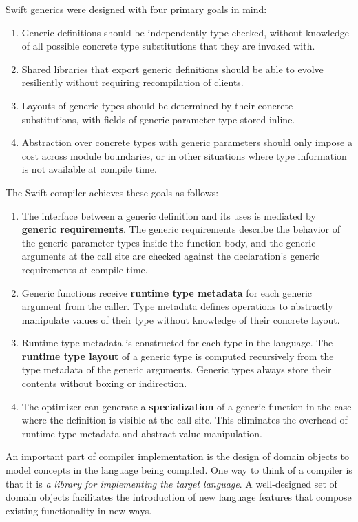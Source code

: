 \documentclass[a4paper,headsepline,bibliography=totoc,toc=flat,fleqn,twoside=semi]{scrbook}
\theoremstyle{definition}
\theoremstyle{definition}
\theoremstyle{definition}
\begin{document}
Swift generics were designed with four primary goals in mind:
\begin{enumerate}
\item Generic definitions should be independently type checked, without knowledge of all possible concrete type substitutions that they are invoked with.
\item Shared libraries that export generic definitions should be able to evolve resiliently without requiring recompilation of clients.
\item Layouts of generic types should be determined by their concrete substitutions, with fields of generic parameter type stored inline.
\item Abstraction over concrete types with generic parameters should only impose a cost across module boundaries, or in other situations where type information is not available at compile time.
\end{enumerate}
The Swift compiler achieves these goals as follows:
\begin{enumerate}
\item The interface between a generic definition and its uses is mediated by \textbf{generic requirements}. The generic requirements describe the behavior of the generic parameter types inside the function body, and the generic arguments at the call site are checked against the declaration's generic requirements at compile time.
\item Generic functions receive \textbf{runtime type metadata} for each generic argument from the caller. Type metadata defines operations to abstractly manipulate values of their type without knowledge of their concrete layout.
\item Runtime type metadata is constructed for each type in the language. The \textbf{runtime type layout} of a generic type is computed recursively from the type metadata of the generic arguments. Generic types always store their contents without boxing or indirection.
\item The optimizer can generate a \textbf{specialization} of a generic function in the case where the definition is visible at the call site. This eliminates the overhead of runtime type metadata and abstract value manipulation.
\end{enumerate}

An important part of compiler implementation is the design of domain objects to model concepts in the language being compiled. One way to think of a compiler is that it is \emph{a library for implementing the target language}. A well-designed set of domain objects facilitates the introduction of new language features that compose existing functionality in new ways.
\end{document}
